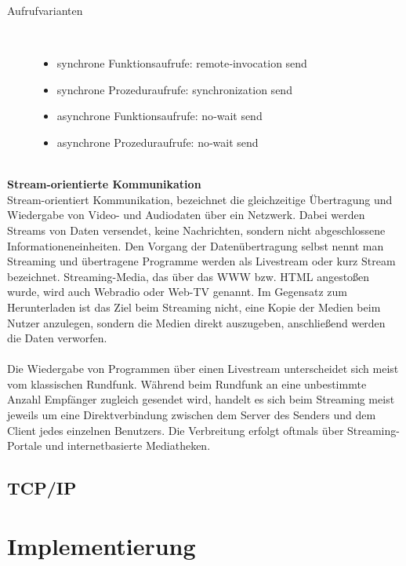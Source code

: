 \documentclass[a4paper,12pt]{article}
\begin{document}
\newpage
\noindent
\begin{description}
    \item[Aufrufvarianten] ~\par
    \begin{itemize}
        \item synchrone Funktionsaufrufe: remote‑invocation send
        \item synchrone Prozeduraufrufe: synchronization send
        \item asynchrone Funktionsaufrufe: no‑wait send
        \item asynchrone Prozeduraufrufe: no‑wait send\\\\
    \end{itemize} 
\end{description}
\textbf{Stream-orientierte Kommunikation}\\
Stream-orientiert Kommunikation, bezeichnet die gleichzeitige Übertragung und Wiedergabe von Video- und Audiodaten über ein Netzwerk.
Dabei werden Streams von Daten versendet, keine Nachrichten, sondern nicht abgeschlossene Informationeneinheiten.
Den Vorgang der Datenübertragung selbst nennt man Streaming und übertragene Programme werden als Livestream oder kurz Stream bezeichnet. Streaming-Media, das über das WWW bzw. HTML angestoßen wurde, wird auch Webradio oder Web-TV genannt. Im Gegensatz zum Herunterladen ist das Ziel beim Streaming nicht, eine Kopie der Medien beim Nutzer anzulegen, sondern die Medien direkt auszugeben, anschließend werden die Daten verworfen.
\\\\
Die Wiedergabe von Programmen über einen Livestream unterscheidet sich meist vom klassischen Rundfunk. Während beim Rundfunk an eine unbestimmte Anzahl Empfänger zugleich gesendet wird, handelt es sich beim Streaming meist jeweils um eine Direktverbindung zwischen dem Server des Senders und dem Client jedes einzelnen Benutzers. Die Verbreitung erfolgt oftmals über Streaming-Portale und internetbasierte Mediatheken.
\cite{communication2}
\newpage
\noindent
\subsection{TCP/IP}



\newpage
\noindent
\section{Implementierung}
\end{document}
